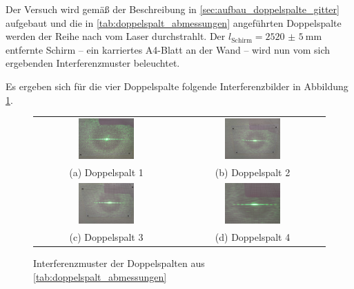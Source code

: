 \documentclass[ngerman]{scrartcl}
\begin{document}
Der Versuch wird gemäß der Beschreibung in \autoref{sec:aufbau_doppelspalte_gitter} aufgebaut und die in \autoref{tab:doppelspalt_abmessungen} angeführten Doppelspalte werden der Reihe nach vom Laser durchstrahlt. Der $l_\text{Schirm} = \SI{2520(5)}{\milli\meter}$ entfernte Schirm -- ein karriertes A4-Blatt an der Wand -- wird nun vom sich ergebenden Interferenzmuster beleuchtet.

Es ergeben sich für die vier Doppelspalte folgende Interferenzbilder in Abbildung \ref{fig:DS_interferenzmuster}.
%

\begin{figure}[htbp]
    \centering
    \begin{tabular}{cc}
      \includegraphics[width=0.4\textwidth]{fig/Compressed/DS1_0_20_25.jpg} &
      \includegraphics[width=0.4\textwidth]{fig/Compressed/DS2_0_10_25.jpg} \\
      (a) Doppelspalt 1 & (b) Doppelspalt 2 \\
      \includegraphics[width=0.4\textwidth]{fig/Compressed/DS3_0_10_5.jpg} &
      \includegraphics[width=0.4\textwidth]{fig/Compressed/DS4_0_11.jpg} \\
    (c) Doppelspalt 3 & (d) Doppelspalt 4 \\
    \end{tabular}
    \caption{Interferenzmuster der Doppelspalten aus \autoref{tab:doppelspalt_abmessungen}}
    \label{fig:DS_interferenzmuster}
  \end{figure}
\end{document}
